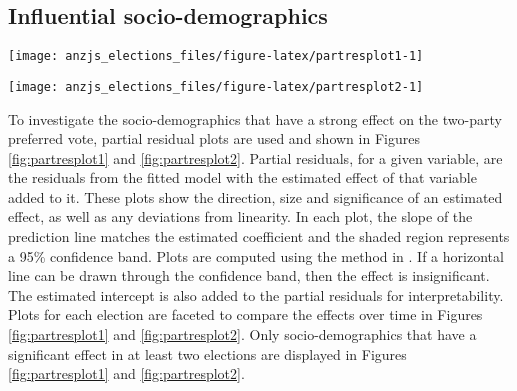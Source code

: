 \documentclass[times, doublespace]{anzsauth}
\let\origfigure\figure
\let\endorigfigure\endfigure
\renewenvironment{figure}[1][2] {
    \expandafter\origfigure\expandafter[htbp]
} {
    \endorigfigure
}
\begin{document}
\hypertarget{influential-socio-demographics}{%
\subsection{Influential socio-demographics}\label{influential-socio-demographics}}



\begin{figure}[h]

{\centering \texttt{[image: anzjs\_elections\_files/figure-latex/partresplot1-1]} 

}

\caption{Partial residual plots by election year for a selection of predictors. Linear model with 95\% confidence bands overlaid. Most predictors have a positive relationship: the larger the value the more likely the electorate preferences Liberal. The relationship is relatively robust over time, with the exception of \texttt{DiffAddress}, \texttt{Incomes}, \texttt{OtherLanguageHome} and \texttt{Pop\_00\_19}.}\label{fig:partresplot1}
\end{figure}



\begin{figure}[h]

{\centering \texttt{[image: anzjs\_elections\_files/figure-latex/partresplot2-1]} 

}

\caption{Partial residual plots by election year for a selection of predictors. Linear model with 95\% confidence bands overlaid. Several predictors have a negative relationship: with larger values indicating the electorate more likely preferences Labor. Most relationships are relatively stable over elections, except \texttt{Unemployment} and \texttt{Education}."}\label{fig:partresplot2}
\end{figure}

To investigate the socio-demographics that have a strong effect on the two-party preferred vote, partial residual plots are used and shown in Figures \ref{fig:partresplot1} and \ref{fig:partresplot2}. Partial residuals, for a given variable, are the residuals from the fitted model with the estimated effect of that variable added to it. These plots show the direction, size and significance of an estimated effect, as well as any deviations from linearity. In each plot, the slope of the prediction line matches the estimated coefficient and the shaded region represents a 95\% confidence band. Plots are computed using the method in \citet{visreg}. If a horizontal line can be drawn through the confidence band, then the effect is insignificant. The estimated intercept is also added to the partial residuals for interpretability. Plots for each election are faceted to compare the effects over time in Figures \ref{fig:partresplot1} and \ref{fig:partresplot2}. Only socio-demographics that have a significant effect in at least two elections are displayed in Figures \ref{fig:partresplot1} and \ref{fig:partresplot2}.
\end{document}
